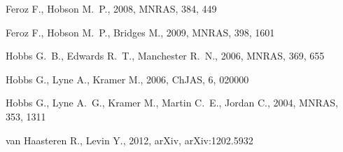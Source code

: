\documentclass[%
 preprint,
 amsmath,amssymb,amsfonts,
 aps,
]{revtex4-1}
\begin{document}
\begin{thebibliography}{}
\setlength{\labelwidth}{0pt} %

 Feroz F., Hobson M.~P., 2008, MNRAS, 384, 449 


 Feroz F., Hobson M.~P., Bridges M., 2009, MNRAS, 398, 1601 

 Hobbs G.~B., Edwards R.~T., Manchester R.~N., 2006, MNRAS, 369, 655 

 Hobbs G., Lyne A., Kramer M., 2006, ChJAS, 6, 020000 


Hobbs G., Lyne A.~G., Kramer M., Martin C.~E., Jordan C., 2004, MNRAS, 353, 
1311 

 van Haasteren R., Levin Y., 2012, arXiv, arXiv:1202.5932

\end{thebibliography}
\end{document}
